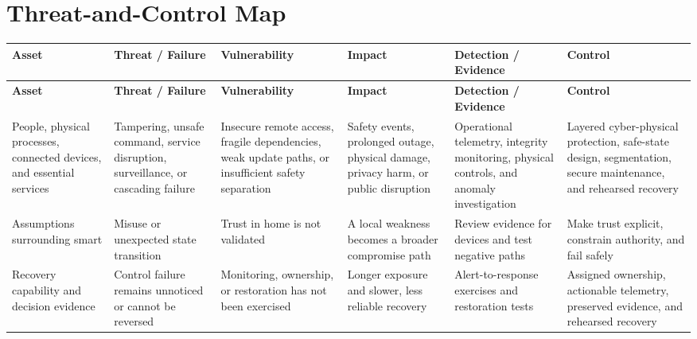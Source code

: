 \documentclass[11pt,letterpaper]{article}
\begin{document}
\section*{Threat-and-Control Map}
\begingroup\scriptsize\setlength{\tabcolsep}{2pt}
\begin{longtable}{>{\raggedright\arraybackslash}p{}>{\raggedright\arraybackslash}p{}>{\raggedright\arraybackslash}p{}>{\raggedright\arraybackslash}p{}>{\raggedright\arraybackslash}p{}>{\raggedright\arraybackslash}p{}}
\toprule\rowcolor{Navy}\color{white}\textbf{Asset} & \color{white}\textbf{Threat / Failure} & \color{white}\textbf{Vulnerability} & \color{white}\textbf{Impact} & \color{white}\textbf{Detection / Evidence} & \color{white}\textbf{Control}\\\midrule
\endfirsthead
\toprule\rowcolor{Navy}\color{white}\textbf{Asset} & \color{white}\textbf{Threat / Failure} & \color{white}\textbf{Vulnerability} & \color{white}\textbf{Impact} & \color{white}\textbf{Detection / Evidence} & \color{white}\textbf{Control}\\\midrule
\endhead
People, physical processes, connected devices, and essential services & Tampering, unsafe command, service disruption, surveillance, or cascading failure & Insecure remote access, fragile dependencies, weak update paths, or insufficient safety separation & Safety events, prolonged outage, physical damage, privacy harm, or public disruption & Operational telemetry, integrity monitoring, physical controls, and anomaly investigation & Layered cyber-physical protection, safe-state design, segmentation, secure maintenance, and rehearsed recovery\\\midrule
Assumptions surrounding smart & Misuse or unexpected state transition & Trust in home is not validated & A local weakness becomes a broader compromise path & Review evidence for devices and test negative paths & Make trust explicit, constrain authority, and fail safely\\\midrule
Recovery capability and decision evidence & Control failure remains unnoticed or cannot be reversed & Monitoring, ownership, or restoration has not been exercised & Longer exposure and slower, less reliable recovery & Alert-to-response exercises and restoration tests & Assigned ownership, actionable telemetry, preserved evidence, and rehearsed recovery\\\midrule
\bottomrule
\end{longtable}
\endgroup
\end{document}
